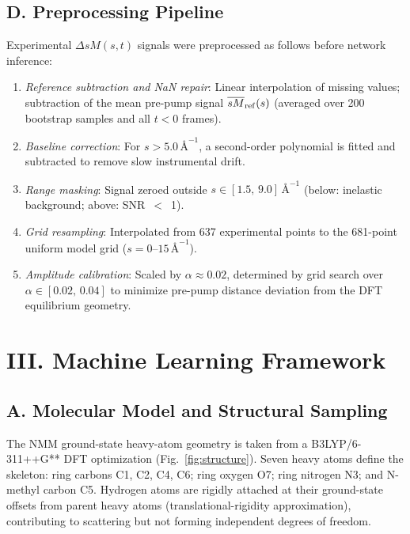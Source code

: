 \documentclass[12pt]{article}
\newcommand{\dsm}{\Delta sM}
\newcommand{\anginv}{\,\text{\AA}^{-1}}
\begin{document}
\subsection*{D.\; Preprocessing Pipeline}

Experimental $\dsm(s,t)$ signals were preprocessed as follows before
network inference:
\begin{enumerate}
  \item \textit{Reference subtraction and NaN repair}: Linear
    interpolation of missing values; subtraction of the mean pre-pump
    signal $\overline{sM}_{\rm ref}(s)$ (averaged over 200 bootstrap
    samples and all $t{<}0$ frames).
  \item \textit{Baseline correction}: For $s > 5.0\anginv$, a
    second-order polynomial is fitted and subtracted to remove slow
    instrumental drift.
  \item \textit{Range masking}: Signal zeroed outside
    $s \in [1.5,\,9.0]\anginv$ (below: inelastic background; above:
    SNR~$<$~1).
  \item \textit{Grid resampling}: Interpolated from 637 experimental
    points to the 681-point uniform model grid
    ($s = 0$--$15\anginv$).
  \item \textit{Amplitude calibration}: Scaled by $\alpha \approx 0.02$,
    determined by grid search over $\alpha \in [0.02,\,0.04]$ to
    minimize pre-pump distance deviation from the DFT equilibrium
    geometry.
\end{enumerate}

\section*{III.\; Machine Learning Framework}

\subsection*{A.\; Molecular Model and Structural Sampling}

The NMM ground-state heavy-atom geometry is taken from a
B3LYP/6-311++G** DFT optimization (Fig.~\ref{fig:structure}).
Seven heavy atoms define the skeleton: ring carbons C1, C2, C4, C6;
ring oxygen O7; ring nitrogen N3; and N-methyl carbon C5. Hydrogen
atoms are rigidly attached at their ground-state offsets from parent
heavy atoms (translational-rigidity approximation), contributing to
scattering but not forming independent degrees of freedom.
\end{document}
